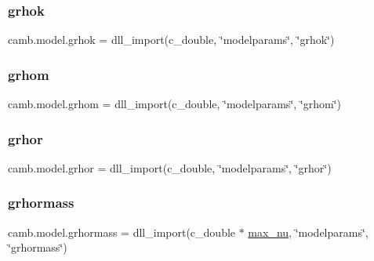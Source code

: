 \subsubsection{\texorpdfstring{grhok}{grhok}}
{\footnotesize\ttfamily camb.\+model.\+grhok = dll\+\_\+import(c\+\_\+double, \char`\"{}modelparams\char`\"{}, \char`\"{}grhok\char`\"{})}

\mbox{\label{namespacecamb_1_1model_a3f8d35a6caaf48f968ec4abb112bc8e1}} 
\subsubsection{\texorpdfstring{grhom}{grhom}}
{\footnotesize\ttfamily camb.\+model.\+grhom = dll\+\_\+import(c\+\_\+double, \char`\"{}modelparams\char`\"{}, \char`\"{}grhom\char`\"{})}

\mbox{\label{namespacecamb_1_1model_af769aaea323cd956bd13dcb8064e7b96}} 
\subsubsection{\texorpdfstring{grhor}{grhor}}
{\footnotesize\ttfamily camb.\+model.\+grhor = dll\+\_\+import(c\+\_\+double, \char`\"{}modelparams\char`\"{}, \char`\"{}grhor\char`\"{})}

\mbox{\label{namespacecamb_1_1model_a0d98f795e1db0281c930cd8101f83b24}} 
\subsubsection{\texorpdfstring{grhormass}{grhormass}}
{\footnotesize\ttfamily camb.\+model.\+grhormass = dll\+\_\+import(c\+\_\+double $\ast$ \mbox{\hyperlink{namespacecamb_1_1model_aa5aed77e19cbb25b308fbdd5e9cea419}{max\+\_\+nu}}, \char`\"{}modelparams\char`\"{}, \char`\"{}grhormass\char`\"{})}

\mbox{\label{namespacecamb_1_1model_a060a0ab339fdd04f13e45b099d7f7a95}} 
